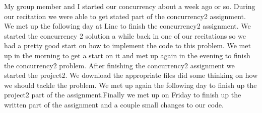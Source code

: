 \documentclass[letterpaper,10pt,titlepage]{article}
\begin{document}
My group member and I started our concurrency about a week ago or so. During our recitation we were able to get stated part of the concurrency2 assignment. We met up the following day at Linc to finish the concurrency2 assignment. We started the concurrency 2 solution a while back in one of our recitations so we had a pretty good start on how to implement the code to this problem. We met up in the morning to get a start on it and met up again in the evening to finish the concurrency2 problem. After finishing the concurrency2 assignment we started the project2. We download the appropriate files did some thinking on how we should tackle the problem. We met up again the following day to finish up the project2 part of the assignment.Finally we met up on Friday to finish up the written part of the assignment and a couple small changes to our code.
\end{document}
